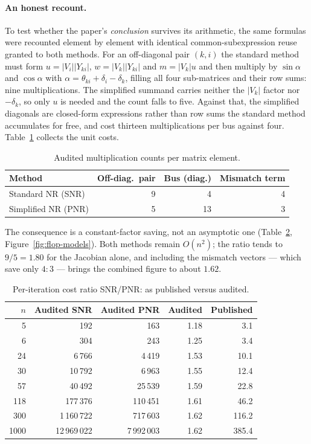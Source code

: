 \documentclass[sigconf,nonacm]{acmart}
\begin{document}
\paragraph{An honest recount.}
To test whether the paper's \emph{conclusion} survives its arithmetic, the same
formulas were recounted element by element with identical common-subexpression
reuse granted to both methods. For an off-diagonal pair $(k,i)$ the standard
method must form $u = |V_i||Y_{ki}|$, $w = |V_k||Y_{ki}|$ and $m = |V_k|u$ and
then multiply by $\sin\alpha$ and $\cos\alpha$ with
$\alpha = \theta_{ki}+\delta_i-\delta_k$, filling all four sub-matrices and
their row sums: nine multiplications. The simplified summand carries neither the
$|V_k|$ factor nor $-\delta_k$, so only $u$ is needed and the count falls to
five. Against that, the simplified diagonals are closed-form expressions rather
than row sums the standard method accumulates for free, and cost thirteen
multiplications per bus against four. Table~\ref{tab:audit-unit} collects the
unit costs.

\begin{table}[t]
\centering
\caption{Audited multiplication counts per matrix element.}
\label{tab:audit-unit}
\footnotesize
\setlength{\tabcolsep}{4pt}
\begin{tabular}{l r r r}
\toprule
Method & Off-diag.\ pair & Bus (diag.) & Mismatch term \\
\midrule
Standard NR (SNR)   & 9 & 4  & 4 \\
Simplified NR (PNR) & 5 & 13 & 3 \\
\bottomrule
\end{tabular}
\end{table}

The consequence is a constant-factor saving, not an asymptotic one
(Table~\ref{tab:flop-models}, Figure~\ref{fig:flop-models}). Both methods remain
$O(n^2)$; the ratio tends to $9/5 = 1.80$ for the Jacobian alone, and including
the mismatch vectors --- which save only $4\!:\!3$ --- brings the combined
figure to about $1.62$.

\begin{table}[t]
\centering
\caption{Per-iteration cost ratio SNR/PNR: as published versus audited.}
\label{tab:flop-models}
\small
\begin{tabular}{r r r r r}
\toprule
$n$ & Audited SNR & Audited PNR & Audited & Published \\
\midrule
5    & 192          & 163         & 1.18 & 3.1 \\
6    & 304          & 243         & 1.25 & 3.4 \\
24   & 6\,766       & 4\,419      & 1.53 & 10.1 \\
30   & 10\,792      & 6\,963      & 1.55 & 12.4 \\
57   & 40\,492      & 25\,539     & 1.59 & 22.8 \\
118  & 177\,376     & 110\,451    & 1.61 & 46.2 \\
300  & 1\,160\,722  & 717\,603    & 1.62 & 116.2 \\
1000 & 12\,969\,022 & 7\,992\,003 & 1.62 & 385.4 \\
\bottomrule
\end{tabular}
\end{table}
\end{document}
